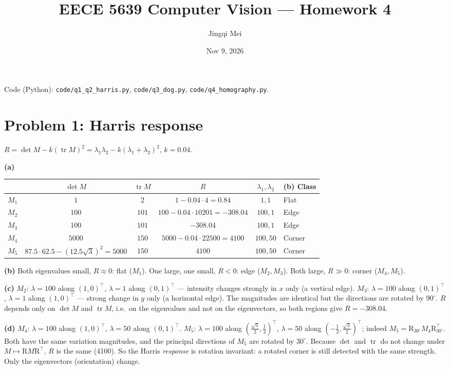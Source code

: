 \documentclass[11pt]{article}
\title{EECE 5639 Computer Vision --- Homework 4}
\author{Jingqi Mei}
\date{Nov 9, 2026}
\newcommand{\R}{\mathrm{R}}
\begin{document}
\maketitle
Code (Python): \texttt{code/q1\_q2\_harris.py}, \texttt{code/q3\_dog.py}, \texttt{code/q4\_homography.py}.

\section*{Problem 1: Harris response}

$R=\det M-k(\operatorname{tr}M)^2=\lambda_1\lambda_2-k(\lambda_1+\lambda_2)^2$, $k=0.04$.

\textbf{(a)}
\begin{center}
\begin{tabular}{lccccl}
\toprule
& $\det M$ & $\operatorname{tr} M$ & $R$ & $\lambda_1,\lambda_2$ & \textbf{(b)} Class\\
\midrule
$M_1$ & $1$ & $2$ & $1-0.04\cdot4=0.84$ & $1,1$ & Flat\\
$M_2$ & $100$ & $101$ & $100-0.04\cdot10201=-308.04$ & $100,1$ & Edge\\
$M_3$ & $100$ & $101$ & $-308.04$ & $100,1$ & Edge\\
$M_4$ & $5000$ & $150$ & $5000-0.04\cdot22500=4100$ & $100,50$ & Corner\\
$M_5$ & $87.5\cdot62.5-(12.5\sqrt3)^2=5000$ & $150$ & $4100$ & $100,50$ & Corner\\
\bottomrule
\end{tabular}
\end{center}

\textbf{(b)} Both eigenvalues small, $R\approx0$: flat ($M_1$). One large, one small, $R<0$: edge ($M_2,M_3$). Both large, $R\gg0$: corner ($M_4,M_5$).

\textbf{(c)} $M_2$: $\lambda=100$ along $(1,0)^\top$, $\lambda=1$ along $(0,1)^\top$ --- intensity changes strongly in $x$ only (a vertical edge).
$M_3$: $\lambda=100$ along $(0,1)^\top$, $\lambda=1$ along $(1,0)^\top$ --- strong change in $y$ only (a horizontal edge).
The magnitudes are identical but the directions are rotated by $90^\circ$. $R$ depends only on $\det M$ and $\operatorname{tr}M$, i.e.\ on the eigenvalues and not on the eigenvectors, so both regions give $R=-308.04$.

\textbf{(d)} $M_4$: $\lambda=100$ along $(1,0)^\top$, $\lambda=50$ along $(0,1)^\top$.
$M_5$: $\lambda=100$ along $(\tfrac{\sqrt3}{2},\tfrac12)^\top$, $\lambda=50$ along $(-\tfrac12,\tfrac{\sqrt3}{2})^\top$; indeed $M_5=\R_{30^\circ}M_4\R_{30^\circ}^\top$.
Both have the same variation magnitudes, and the principal directions of $M_5$ are rotated by $30^\circ$.
Because $\det$ and $\operatorname{tr}$ do not change under $M\mapsto \R M\R^\top$, $R$ is the same (4100).
So the Harris \emph{response} is rotation invariant: a rotated corner is still detected with the same strength. Only the eigenvectors (orientation) change.
\end{document}
